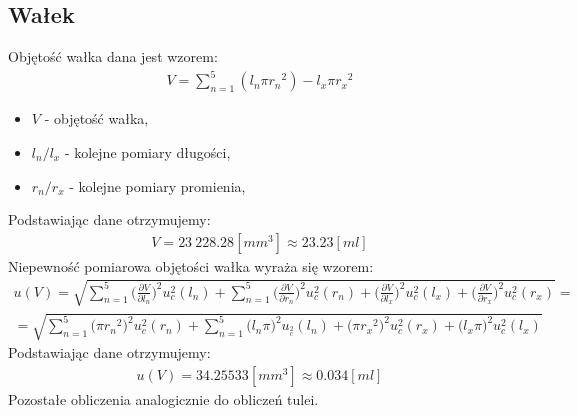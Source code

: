 \documentclass[11pt]{article}
\begin{document}
    \subsection{Wałek}
    \noindent Objętość wałka dana jest wzorem:
    \begin{gather*}
        V =  \sum_{n=1}^{5}(l_n\pi {r_{n}}^2)-l_x\pi {r_{x}}^2
    \end{gather*}
    {
        \footnotesize
        \begin{itemize}
         \setlength\itemsep{0.1em}
         \item[] $V$ - objętość wałka,
         \item[] $l_n/l_x$ - kolejne pomiary długości,
         \item[] $r_n/r_x$ - kolejne pomiary promienia,
    \end{itemize}
    }
    \noindent Podstawiając dane otrzymujemy:
    \begin{gather*}
        V = 23\ 228.28[mm^3]\approx 23.23 [ml]
    \end{gather*}
    \noindent Niepewność pomiarowa objętości wałka wyraża się wzorem:
    \begin{gather*}
        u(V) = \sqrt{\sum_{n=1}^{5} \biggl(\frac{\partial V}{\partial l_n}\biggr)^2 u_c^2(l_n)+
        {\sum_{n=1}^{5} \biggl(\frac{\partial V}{\partial r_n}\biggr)^2 u_c^2(r_n)}+
        { \biggl(\frac{\partial V}{\partial l_x}\biggr)^2 u_c^2(l_x)}+
        { \biggl(\frac{\partial V}{\partial r_x}\biggr)^2 u_c^2(r_x)}}=\\
        =\sqrt{ \sum_{n=1}^{5} { \biggl( \pi {r_n}^2 \biggr)^2 u_c^2(r_n)}+
        { \sum_{n=1}^{5} { \biggl( l_n \pi \biggr)^2 u__c^2(l_n)}}+
        { \biggl(  \pi {r_x}^2 \biggr)^2 u_c^2(r_x)}+
        { \biggl( l_x \pi  \biggr)^2 u_c^2(l_x)}}
    \end{gather*}
    \noindent Podstawiając dane otrzymujemy:
    \begin{gather*}
        u(V)=34.25533[mm^3]\approx 0.034 [ml]
    \end{gather*}
    \noindent Pozostałe obliczenia analogicznie do obliczeń tulei.

\end{document}
